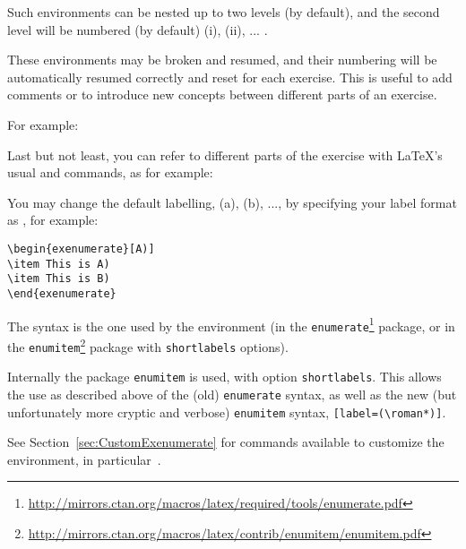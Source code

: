 \documentclass[11pt,a4paper]{article}
\begin{document}

Such  environments can be nested up to two levels (by default), and
the second level will be numbered (by default) (i), (ii), ... .

These environments may be broken and resumed, and their numbering will be automatically
resumed correctly and reset for each exercise. This is useful to add comments or to
introduce new concepts between different parts of an exercise.

For example:
\begin{pkgverbatim}
%
\end{pkgverbatim}

Last but not least, you can refer to different parts of the exercise with \LaTeX's usual
 and 
commands, as for example:
\begin{pkgverbatim}
%
\end{pkgverbatim}

You may change the default labelling, (a), (b), ..., by specifying your label format as
, for example:
\begin{pkgverbatim}
\begin{verbatim}
\begin{exenumerate}[A)]
\item This is A)
\item This is B)
\end{exenumerate}
\end{verbatim}
\end{pkgverbatim}
The syntax is the one used by the  environment (in the
\texttt{enumerate}\footnote{\url{http://mirrors.ctan.org/macros/latex/required/tools/enumerate.pdf}}
package, or in the
\texttt{enumitem}\footnote{\url{http://mirrors.ctan.org/macros/latex/contrib/enumitem/enumitem.pdf}}
package with \texttt{shortlabels} options).

\begin{pkgtip}
  Internally the package \texttt{enumitem} is used, with option \texttt{shortlabels}. This
  allows the use as described above of the (old) \texttt{enumerate} syntax, as well as the
  new (but unfortunately more cryptic and verbose) \texttt{enumitem} syntax,
  \texttt{[label=(\textbackslash roman*)]}.

  See Section~\ref{sec:CustomExenumerate} for commands available to customize the
   environment, in particular~.
\end{pkgtip}
\end{document}
